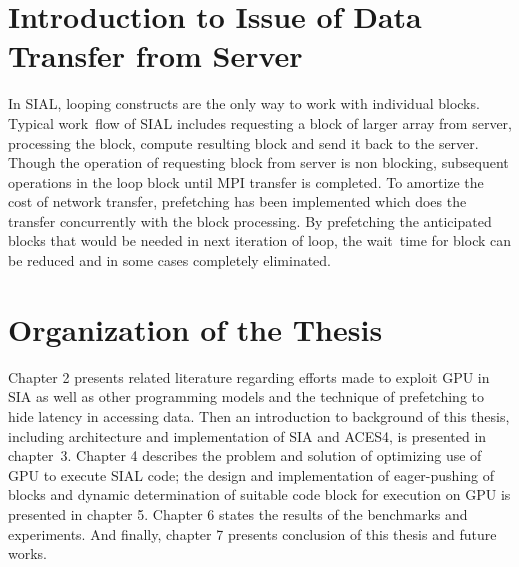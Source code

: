 \section{Introduction to Issue of Data Transfer from Server}
In SIAL, looping constructs are the only way to work with individual blocks.
Typical work~flow of SIAL includes requesting a block of larger array from server,
processing the block, compute resulting block and send it back to the server. Though
the operation of requesting block from server is non blocking, subsequent operations
in the loop block until MPI transfer is completed. To amortize the cost of network
transfer, prefetching has been implemented which does the transfer concurrently
with the block processing. By prefetching the anticipated blocks that would be
needed in next iteration of loop, the wait~time for block can be reduced and
in some cases completely eliminated.

\section{Organization of the Thesis}
Chapter 2 presents related literature regarding efforts made to exploit GPU in
SIA as well as other programming models and the technique of prefetching to hide
latency in accessing data. Then an introduction to background of this thesis,
including architecture and implementation of SIA and ACES4, is presented in chapter~3.
Chapter 4 describes the problem and solution of optimizing use of GPU to execute SIAL
code; the design and implementation of eager-pushing of blocks and dynamic
determination of suitable code block for execution on GPU is presented in
chapter 5. Chapter 6 states the results of the benchmarks and experiments. And
finally, chapter 7 presents conclusion of this thesis and future works.